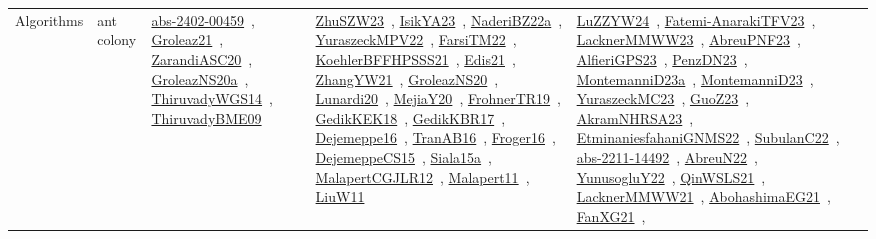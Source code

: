 {\begin{longtable}{lp{3cm}>{\raggedright\arraybackslash}p{6cm}>{\raggedright\arraybackslash}p{6cm}>{\raggedright\arraybackslash}p{8cm}}
Algorithms & ant colony & \href{../works/abs-2402-00459.pdf}{abs-2402-00459}~\cite{abs-2402-00459}, \href{../works/Groleaz21.pdf}{Groleaz21}~\cite{Groleaz21}, \href{../works/ZarandiASC20.pdf}{ZarandiASC20}~\cite{ZarandiASC20}, \href{../works/GroleazNS20a.pdf}{GroleazNS20a}~\cite{GroleazNS20a}, \href{../works/ThiruvadyWGS14.pdf}{ThiruvadyWGS14}~\cite{ThiruvadyWGS14}, \href{../works/ThiruvadyBME09.pdf}{ThiruvadyBME09}~\cite{ThiruvadyBME09} & \href{../works/ZhuSZW23.pdf}{ZhuSZW23}~\cite{ZhuSZW23}, \href{../works/IsikYA23.pdf}{IsikYA23}~\cite{IsikYA23}, \href{../works/NaderiBZ22a.pdf}{NaderiBZ22a}~\cite{NaderiBZ22a}, \href{../works/YuraszeckMPV22.pdf}{YuraszeckMPV22}~\cite{YuraszeckMPV22}, \href{../works/FarsiTM22.pdf}{FarsiTM22}~\cite{FarsiTM22}, \href{../works/KoehlerBFFHPSSS21.pdf}{KoehlerBFFHPSSS21}~\cite{KoehlerBFFHPSSS21}, \href{../works/Edis21.pdf}{Edis21}~\cite{Edis21}, \href{../works/ZhangYW21.pdf}{ZhangYW21}~\cite{ZhangYW21}, \href{../works/GroleazNS20.pdf}{GroleazNS20}~\cite{GroleazNS20}, \href{../works/Lunardi20.pdf}{Lunardi20}~\cite{Lunardi20}, \href{../works/MejiaY20.pdf}{MejiaY20}~\cite{MejiaY20}, \href{../works/FrohnerTR19.pdf}{FrohnerTR19}~\cite{FrohnerTR19}, \href{../works/GedikKEK18.pdf}{GedikKEK18}~\cite{GedikKEK18}, \href{../works/GedikKBR17.pdf}{GedikKBR17}~\cite{GedikKBR17}, \href{../works/Dejemeppe16.pdf}{Dejemeppe16}~\cite{Dejemeppe16}, \href{../works/TranAB16.pdf}{TranAB16}~\cite{TranAB16}, \href{../works/Froger16.pdf}{Froger16}~\cite{Froger16}, \href{../works/DejemeppeCS15.pdf}{DejemeppeCS15}~\cite{DejemeppeCS15}, \href{../works/Siala15a.pdf}{Siala15a}~\cite{Siala15a}, \href{../works/MalapertCGJLR12.pdf}{MalapertCGJLR12}~\cite{MalapertCGJLR12}, \href{../works/Malapert11.pdf}{Malapert11}~\cite{Malapert11}, \href{../works/LiuW11.pdf}{LiuW11}~\cite{LiuW11} & \href{../works/LuZZYW24.pdf}{LuZZYW24}~\cite{LuZZYW24}, \href{../works/Fatemi-AnarakiTFV23.pdf}{Fatemi-AnarakiTFV23}~\cite{Fatemi-AnarakiTFV23}, \href{../works/LacknerMMWW23.pdf}{LacknerMMWW23}~\cite{LacknerMMWW23}, \href{../works/AbreuPNF23.pdf}{AbreuPNF23}~\cite{AbreuPNF23}, \href{../works/AlfieriGPS23.pdf}{AlfieriGPS23}~\cite{AlfieriGPS23}, \href{../works/PenzDN23.pdf}{PenzDN23}~\cite{PenzDN23}, \href{../works/MontemanniD23a.pdf}{MontemanniD23a}~\cite{MontemanniD23a}, \href{../works/MontemanniD23.pdf}{MontemanniD23}~\cite{MontemanniD23}, \href{../works/YuraszeckMC23.pdf}{YuraszeckMC23}~\cite{YuraszeckMC23}, \href{../works/GuoZ23.pdf}{GuoZ23}~\cite{GuoZ23}, \href{../works/AkramNHRSA23.pdf}{AkramNHRSA23}~\cite{AkramNHRSA23}, \href{../works/EtminaniesfahaniGNMS22.pdf}{EtminaniesfahaniGNMS22}~\cite{EtminaniesfahaniGNMS22}, \href{../works/SubulanC22.pdf}{SubulanC22}~\cite{SubulanC22}, \href{../works/abs-2211-14492.pdf}{abs-2211-14492}~\cite{abs-2211-14492}, \href{../works/AbreuN22.pdf}{AbreuN22}~\cite{AbreuN22}, \href{../works/YunusogluY22.pdf}{YunusogluY22}~\cite{YunusogluY22}, \href{../works/QinWSLS21.pdf}{QinWSLS21}~\cite{QinWSLS21}, \href{../works/LacknerMMWW21.pdf}{LacknerMMWW21}~\cite{LacknerMMWW21}, \href{../works/AbohashimaEG21.pdf}{AbohashimaEG21}~\cite{AbohashimaEG21}, \href{../works/FanXG21.pdf}{FanXG21}~\cite{FanXG21}, 
\end{longtable}}
